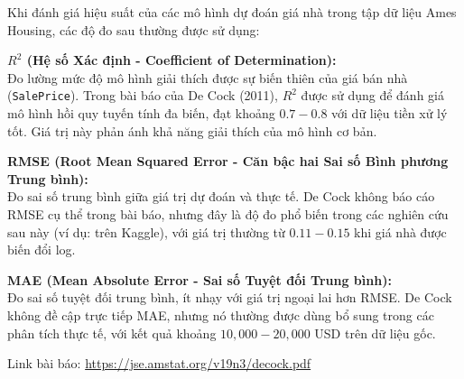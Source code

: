 
Khi đánh giá hiệu suất của các mô hình dự đoán giá nhà trong tập dữ liệu Ames Housing, các độ đo sau thường được sử dụng:

\textbf{$R^2$ (Hệ số Xác định - Coefficient of Determination):} \\
Đo lường mức độ mô hình giải thích được sự biến thiên của giá bán nhà (\texttt{SalePrice}). Trong bài báo của De Cock (2011), $R^2$ được sử dụng để đánh giá mô hình hồi quy tuyến tính đa biến, đạt khoảng $0.7-0.8$ với dữ liệu tiền xử lý tốt. Giá trị này phản ánh khả năng giải thích của mô hình cơ bản.

\textbf{RMSE (Root Mean Squared Error - Căn bậc hai Sai số Bình phương Trung bình):} \\
Đo sai số trung bình giữa giá trị dự đoán và thực tế. De Cock không báo cáo RMSE cụ thể trong bài báo, nhưng đây là độ đo phổ biến trong các nghiên cứu sau này (ví dụ: trên Kaggle), với giá trị thường từ $0.11-0.15$ khi giá nhà được biến đổi log.

\textbf{MAE (Mean Absolute Error - Sai số Tuyệt đối Trung bình):} \\
Đo sai số tuyệt đối trung bình, ít nhạy với giá trị ngoại lai hơn RMSE. De Cock không đề cập trực tiếp MAE, nhưng nó thường được dùng bổ sung trong các phân tích thực tế, với kết quả khoảng $10,000-20,000$ USD trên dữ liệu gốc.

Link bài báo: \url{https://jse.amstat.org/v19n3/decock.pdf}
